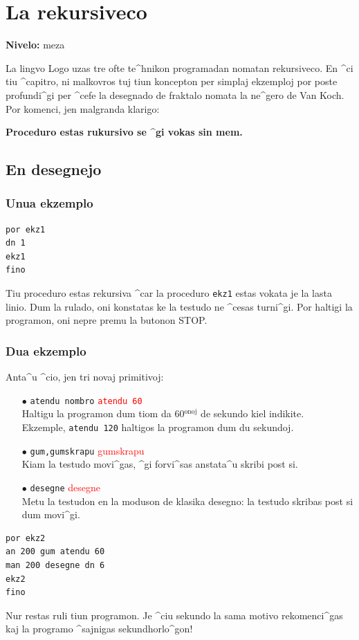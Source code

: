 \chapter{La rekursiveco}
{ }\hfill\textbf{Nivelo:} meza

\noindent  La lingvo Logo uzas tre ofte te^hnikon programadan nomatan
rekursiveco.  En ^ci tiu ^capitro, ni malkovros tuj tiun koncepton per
simplaj ekzemploj por poste profundi^gi per ^cefe la desegnado de
fraktalo nomata la ne^gero de Van Koch.  Por komenci, jen malgranda klarigo:
\begin{center}
\textbf{Proceduro estas rukursivo se ^gi vokas sin mem.}
\end{center}
\section{En desegnejo}
\subsection{Unua ekzemplo}
\begin{verbatim}
por ekz1
dn 1
ekz1
fino  
\end{verbatim}
Tiu proceduro estas rekursiva ^car la proceduro \texttt{ekz1} estas
vokata je la lasta linio.  Dum la rulado, oni konstatas ke la testudo
ne ^cesas turni^gi.  Por haltigi la programon, oni nepre premu la
butonon STOP.
\subsection{Dua ekzemplo}
\noindent Anta^u ^cio, jen tri novaj primitivoj:
\begin{itemize}
\item [$\bullet$] \texttt{atendu nombro}\hspace {4cm } \textcolor{red}{ \texttt{atendu 60}}\\
Haltigu la programon dum tiom da 60$^{\textrm{onoj}}$ de sekundo kiel indikite. \\
Ekzemple, \texttt{atendu 120} haltigos la programon dum du sekundoj.
\item [$\bullet$] \texttt{gum,gumskrapu}\hspace {4cm } \textcolor{red}{{gumskrapu}}\\
Kiam la testudo movi^gas, ^gi forvi^sas anstata^u skribi post si.
\item [$\bullet$] \texttt{desegne}\hspace {4cm } \textcolor{red}{{desegne}}\\
Metu la testudon en la moduson de klasika desegno: la testudo skribas post si dum movi^gi.
\end{itemize}
\noindent
\begin{verbatim}
por ekz2
an 200 gum atendu 60
man 200 desegne dn 6
ekz2
fino
\end{verbatim}
Nur restas ruli tiun programon.  Je ^ciu sekundo la sama motivo
rekomenci^gas kaj la programo ^sajnigas sekundhorlo^gon!

